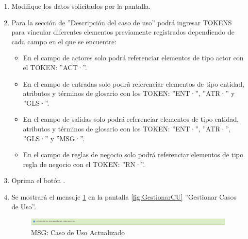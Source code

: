 \begin{enumerate}
			\item Modifique los datos solicitados por la pantalla.
			
			\item Para la sección de ''Descripción del caso de uso'' podrá ingresar TOKENS para vincular diferentes elementos previamente registrados dependiendo de cada campo en el que se encuentre:
			
			\begin{itemize}
				\item En el campo de actores solo podrá referenciar elementos de tipo actor con el TOKEN: ''ACT·''.
				\item En el campo de entradas solo podrá referenciar elementos de tipo entidad, atributos y términos de glosario con los TOKEN: ''ENT·'', ''ATR·'' y ''GLS·''.
				\item En el campo de salidas solo podrá referenciar elementos de tipo entidad, atributos y términos de glosario con los TOKEN: ''ENT·'', ''ATR·'', ''GLS·'' y ''MSG·''.
				\item En el campo de reglas de negocio solo podrá referenciar elementos de tipo regla de negocio con el TOKEN: ''RN·''.
			\end{itemize}
						
			\item Oprima el botón \IUAceptar.
			
			\item Se mostrará el mensaje \ref{fig:CUModificado} en la pantalla \ref{fig:GestionarCU} ''Gestionar Casos de Uso''.
			
			\begin{figure}[htbp!]
				\begin{center}
					\includegraphics[scale=0.5]{roles/lider/casosUso/pantallas/IU11-2MSG1}
					\caption{MSG: Caso de Uso Actualizado}
					\label{fig:CUModificado}
				\end{center}
			\end{figure}
			\end{enumerate}